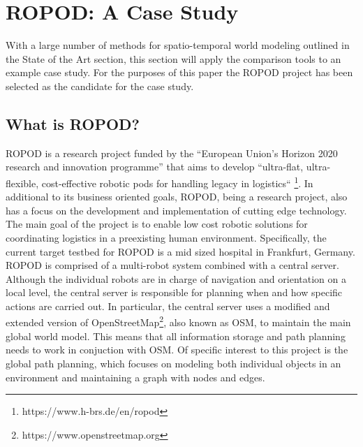 

  \chapter{ROPOD: A Case Study}

  With a large number of methods for spatio-temporal world modeling outlined
  in the State of the Art section, this section will apply the comparison tools
  to an example case study. For the
  purposes of this paper the ROPOD project has been selected as the
  candidate for the case study. \\

  \section{ What is ROPOD? }

  ROPOD is a research project
  funded by the ``European Union's Horizon 2020 research and innovation programme''
  that aims to develop ``ultra-flat, ultra-flexible,
  cost-effective robotic pods for handling legacy in logistics``
  \footnote[1]{https://www.h-brs.de/en/ropod}. In additional to its business
  oriented goals, ROPOD, being a research project, also has a focus on the
  development and implementation of cutting edge technology. The main goal of
  the project is to enable low cost robotic solutions for coordinating logistics
  in a preexisting human environment. Specifically, the current target
  testbed for ROPOD is a mid sized hospital in Frankfurt, Germany.
  ROPOD is comprised of a multi-robot system combined with a central server.
  Although the individual robots are in charge of navigation and orientation
  on a local level, the central server is responsible for planning when and
  how specific actions are carried out. In particular, the central server uses a
  modified and extended version of
  OpenStreetMap\footnote[2]{https://www.openstreetmap.org}, also known as OSM, to
  maintain the main global world model.
  This means that all information storage and path planning needs to work in
  conjuction with OSM. Of specific interest to this project is the global path
  planning, which focuses on modeling both individual objects in an
  environment and maintaining a graph with nodes and edges. \\


